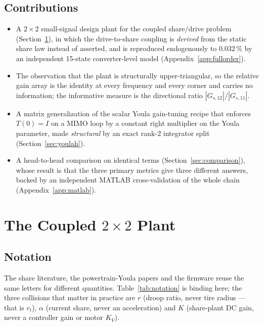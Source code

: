 \documentclass[energies,article,submit,pdftex,oneauthor]{Definitions/mdpi}
\begin{document}
\subsection{Contributions}
\begin{itemize}
\item A $2\times2$ small-signal design plant for the coupled share/drive problem
      (Section~\ref{sec:model}), in which the drive-to-share coupling is \emph{derived} from the
      static share law instead of asserted, and is reproduced endogenously to $0.032\,\%$ by an
      independent 15-state converter-level model (Appendix~\ref{app:fullorder}).
\item The observation that the plant is structurally upper-triangular, so the relative gain array
      is the identity at every frequency and every corner and carries no information; the
      informative measure is the directional ratio $|G_{s,12}|/|G_{s,11}|$.
\item A matrix generalization of the scalar Youla gain-tuning recipe that enforces $T(0)=I$ on a
      MIMO loop by a constant right multiplier on the Youla parameter, made \emph{structural} by
      an exact rank-2 integrator split (Section~\ref{sec:youlah}).
\item A head-to-head comparison on identical terms (Section~\ref{sec:comparison}), whose result
      is that the three primary metrics give three different answers, backed by an independent
      MATLAB cross-validation of the whole chain (Appendix~\ref{app:matlab}).
\end{itemize}

\section{The Coupled $2\times2$ Plant}
\label{sec:model}

\subsection{Notation}
\label{sec:notation}

The share literature, the powertrain-Youla papers and the firmware reuse the same letters for
different quantities. Table~\ref{tab:notation} is binding here; the three collisions that
matter in practice are $r$ (droop ratio, never tire radius --- that is $r_t$), $\alpha$ (current
share, never an acceleration) and $K$ (share-plant DC gain, never a controller gain or motor
$K_V$).
\end{document}

